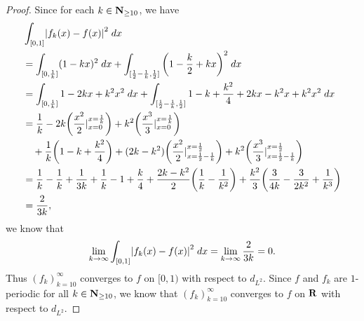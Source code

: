 \begin{proof}
    Since for each \(k \in \mathbf{N}_{\geq 10}\), we have
    \begin{align*}
         & \int_{[0, 1]} \abs{f_k(x) - f(x)}^2 \; dx                                                                                                                                                                                          \\
         & = \int_{[0, \frac{1}{k}]} (1 - kx)^2 \; dx + \int_{[\frac{1}{2} - \frac{1}{k}, \frac{1}{2}]} \bigg(1 - \frac{k}{2} + kx\bigg)^2 \; dx                                                                                              \\
         & = \int_{[0, \frac{1}{k}]} 1 - 2kx + k^2 x^2 \; dx + \int_{[\frac{1}{2} - \frac{1}{k}, \frac{1}{2}]} 1 - k + \frac{k^2}{4} + 2kx - k^2 x + k^2 x^2 \; dx                                                                            \\
         & = \frac{1}{k} - 2k \bigg(\frac{x^2}{2}|_{x = 0}^{x = \frac{1}{k}}\bigg) + k^2 \bigg(\frac{x^3}{3}|_{x = 0}^{x = \frac{1}{k}}\bigg)                                                                                                 \\
         & \quad + \frac{1}{k} \bigg(1 - k + \frac{k^2}{4}\bigg) + (2k - k^2) \bigg(\frac{x^2}{2}|_{x = \frac{1}{2} - \frac{1}{k}}^{x = \frac{1}{2}}\bigg) + k^2 \bigg(\frac{x^3}{3}|_{x = \frac{1}{2} - \frac{1}{k}}^{x = \frac{1}{2}}\bigg) \\
         & = \frac{1}{k} - \frac{1}{k} + \frac{1}{3k} + \frac{1}{k} - 1 + \frac{k}{4} + \frac{2k - k^2}{2} \bigg(\frac{1}{k} - \frac{1}{k^2}\bigg) + \frac{k^2}{3} \bigg(\frac{3}{4k} - \frac{3}{2k^2} + \frac{1}{k^3}\bigg)                  \\
         & = \frac{2}{3k},
    \end{align*}
    we know that
    \[
        \lim_{k \to \infty} \int_{[0, 1]} \abs{f_k(x) - f(x)}^2 \; dx = \lim_{k \to \infty} \frac{2}{3k} = 0.
    \]
    Thus \((f_k)_{k = 10}^\infty\) converges to \(f\) on \([0, 1)\) with respect to \(d_{L^2}\).
    Since \(f\) and \(f_k\) are \(1\)-periodic for all \(k \in \mathbf{N}_{\geq 10}\), we know that \((f_k)_{k = 10}^\infty\) converges to \(f\) on \(\mathbf{R}\) with respect to \(d_{L^2}\).
\end{proof}

